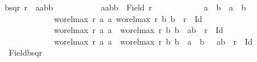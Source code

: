 \begin{isabellebody}
\isanewline
{\isachardoublequoteopen}bsqr\ r\ {\isacharequal}{\kern0pt}\ {\isacharbraceleft}{\kern0pt}{\isacharparenleft}{\kern0pt}{\isacharparenleft}{\kern0pt}a{}{\isacharcomma}{\kern0pt}a{}{\isacharparenright}{\kern0pt}{\isacharcomma}{\kern0pt}{\isacharparenleft}{\kern0pt}b{}{\isacharcomma}{\kern0pt}b{}{\isacharparenright}{\kern0pt}{\isacharparenright}{\kern0pt}{\isachardot}{\kern0pt}\isanewline
\ \ \ \ \ \ \ \ \ \ \ {\isacharbraceleft}{\kern0pt}a{}{\isacharcomma}{\kern0pt}a{}{\isacharcomma}{\kern0pt}b{}{\isacharcomma}{\kern0pt}b{}{\isacharbraceright}{\kern0pt}\ {\isasymle}\ Field\ r\ {\isasymand}\isanewline
\ \ \ \ \ \ \ \ \ \ \ {\isacharparenleft}{\kern0pt}a{}\ {\isacharequal}{\kern0pt}\ b{}\ {\isasymand}\ a{}\ {\isacharequal}{\kern0pt}\ b{}\ {\isasymor}\isanewline
\ \ \ \ \ \ \ \ \ \ \ \ {\isacharparenleft}{\kern0pt}wo{\isacharunderscore}{\kern0pt}rel{\isachardot}{\kern0pt}max{}\ r\ a{}\ a{}{\isacharcomma}{\kern0pt}\ wo{\isacharunderscore}{\kern0pt}rel{\isachardot}{\kern0pt}max{}\ r\ b{}\ b{}{\isacharparenright}{\kern0pt}\ {\isasymin}\ r\ {\isacharminus}{\kern0pt}\ Id\ {\isasymor}\isanewline
\ \ \ \ \ \ \ \ \ \ \ \ wo{\isacharunderscore}{\kern0pt}rel{\isachardot}{\kern0pt}max{}\ r\ a{}\ a{}\ {\isacharequal}{\kern0pt}\ wo{\isacharunderscore}{\kern0pt}rel{\isachardot}{\kern0pt}max{}\ r\ b{}\ b{}\ {\isasymand}\ {\isacharparenleft}{\kern0pt}a{}{\isacharcomma}{\kern0pt}b{}{\isacharparenright}{\kern0pt}\ {\isasymin}\ r\ {\isacharminus}{\kern0pt}\ Id\ {\isasymor}\isanewline
\ \ \ \ \ \ \ \ \ \ \ \ wo{\isacharunderscore}{\kern0pt}rel{\isachardot}{\kern0pt}max{}\ r\ a{}\ a{}\ {\isacharequal}{\kern0pt}\ wo{\isacharunderscore}{\kern0pt}rel{\isachardot}{\kern0pt}max{}\ r\ b{}\ b{}\ {\isasymand}\ a{}\ {\isacharequal}{\kern0pt}\ b{}\ \ {\isasymand}\ {\isacharparenleft}{\kern0pt}a{}{\isacharcomma}{\kern0pt}b{}{\isacharparenright}{\kern0pt}\ {\isasymin}\ r\ {\isacharminus}{\kern0pt}\ Id\isanewline
\ \ \ \ \ \ \ \ \ \ \ {\isacharparenright}{\kern0pt}{\isacharbraceright}{\kern0pt}{\isachardoublequoteclose}\isanewline
\isanewline
{}\isamarkupfalse%
\ Field{\isacharunderscore}{\kern0pt}bsqr{\isacharcolon}{\kern0pt}\isanewline

\end{isabellebody}

